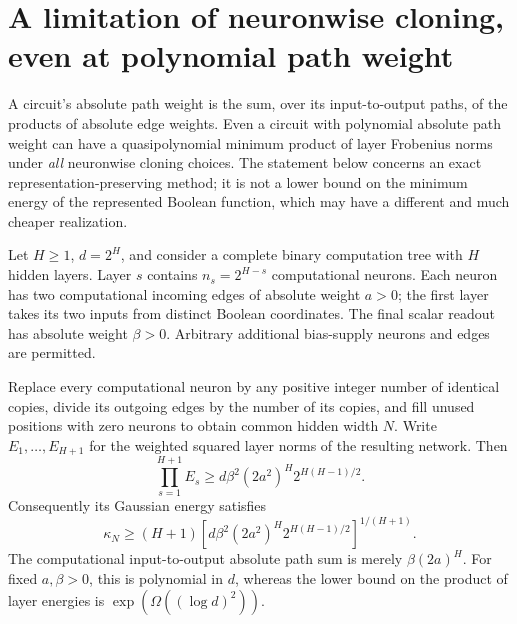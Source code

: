 \section{A limitation of neuronwise cloning, even at polynomial path weight}
\label{sec:neuronwise-cloning-barrier}

A circuit's absolute path weight is the sum, over its input-to-output
paths, of the products of absolute edge weights. Even a circuit with
polynomial absolute path weight can have a
quasipolynomial minimum product of layer Frobenius norms under \emph{all}
neuronwise cloning choices. The statement below concerns an exact
representation-preserving method; it is not a lower bound on the minimum
energy of the represented Boolean function, which may have a different
and much cheaper realization.

\begin{proposition}
Let $H\ge1$, $d=2^H$, and consider a complete binary computation tree with
$H$ hidden layers. Layer $s$ contains $n_s=2^{H-s}$ computational neurons.
Each neuron has two computational incoming edges of absolute weight $a>0$;
the first layer takes its two inputs from distinct Boolean coordinates.
The final scalar readout has absolute weight $\beta>0$.
Arbitrary additional bias-supply neurons and edges are permitted.

Replace every computational neuron by any positive integer number of
identical copies, divide its outgoing edges by the number of its copies,
and fill unused positions with zero neurons to obtain common hidden width
$N$. Write $E_1,\ldots,E_{H+1}$ for the weighted squared layer norms of the
resulting network. Then
\[
 \prod_{s=1}^{H+1}E_s
 \ge d\beta^2(2a^2)^H 2^{H(H-1)/2}.
\]
Consequently its Gaussian energy satisfies
\[
 \kappa_N\ge (H+1)
 \left[d\beta^2(2a^2)^H 2^{H(H-1)/2}\right]^{1/(H+1)}.
\]
The computational input-to-output absolute path sum is merely
$\beta(2a)^H$. For fixed $a,\beta>0$, this is polynomial in $d$, whereas
the lower bound on the product of layer energies is
$\exp(\Omega((\log d)^2))$.
\end{proposition}

